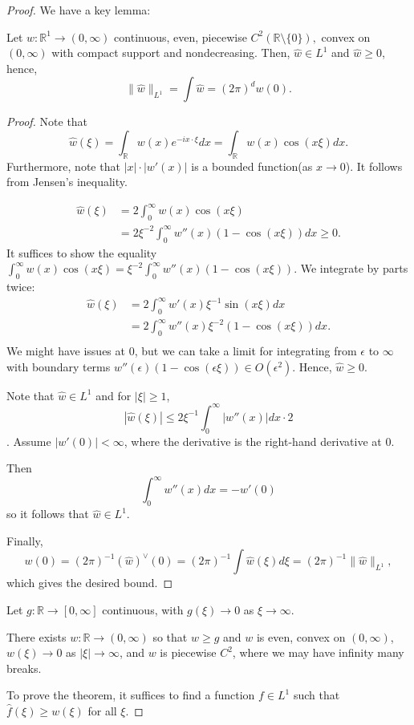 \documentclass[11pt]{scrartcl}
\newcommand{\R}{\mathbb{R}}
\let \hat \widehat
\newcommand{\<}{\langle}
\renewcommand{\>}{\rangle}
\begin{document}
\begin{proof}
We have a key lemma: 
\begin{lemma}
Let $w : \R^1 \rightarrow (0, \infty)$ continuous, even, piecewise $C^2(\R\setminus\{0\}),$ convex on $(0, \infty)$ with compact support and nondecreasing.  Then, $\hat{w} \in L^1$ and $\hat{w} \ge 0$, hence, $$\|\hat{w}\|_{L^1} = \int \hat{w} = (2\pi)^d w(0).$$
\end{lemma}
\begin{proof}
Note that 
$$\hat{w}(\xi) = \int_\R w(x) e^{-ix \cdot \xi} dx = \int_{\R} w(x) \cos(x \xi) dx.$$
Furthermore, note that $|x| \cdot |w'(x)|$ is a bounded function(as $x \rightarrow 0$).  It follows from Jensen's inequality.

\begin{align*}
\hat{w}(\xi) &= 2 \int_{0}^\infty w(x) \cos(x\xi) \\
&= 2 \xi^{-2} \int_0^{\infty} w''(x)(1 - \cos(x \xi)) dx
\ge 0.
\end{align*}
It suffices to show the equality $\int_{0}^\infty w(x) \cos(x\xi) = \xi^{-2} \int_0^{\infty} w''(x)(1 - \cos(x \xi))$.  We integrate by parts twice:
\begin{align*}
\hat{w}(\xi) &= 2 \int_{0}^\infty w'(x) \xi^{-1}\sin(x \xi)dx \\
&= 2 \int_0^\infty w''(x) \xi^{-2}(1 - \cos(x \xi))dx .\\
\end{align*}
We might have issues at $0$, but we can take a limit for integrating from $\epsilon$ to $\infty$ with boundary terms $w''(\epsilon)(1 - \cos(\epsilon \xi)) \in O(\epsilon^2)$.  Hence, $\hat{w} \ge 0$.

Note that $\hat{w} \in L^1$ and for $|\xi| \ge 1$, $$|\hat{w}(\xi)| \le 2 \xi^{-1} \int_0^\infty |w''(x)|dx \cdot 2$$.  
Assume $|w'(0)| < \infty$, where the derivative is the right-hand derivative at $0$.  

Then $$\int_0^{\infty} w''(x)dx = -w'(0)$$
so it follows that $\hat{w} \in L^1$.

Finally,
$$w(0) = (2\pi)^{-1} (\hat{w})^{\vee}(0) = (2\pi)^{-1} \int \hat{w}(\xi) d\xi = (2\pi)^{-1} \|\hat{w}\|_{L^1},$$
which gives the desired bound.
\end{proof}

Let $g: \R \rightarrow [0, \infty]$ continuous, with $g(\xi) \rightarrow 0$ as $\xi \rightarrow \infty$.  
\begin{lemma} There exists $w: \R \rightarrow (0, \infty)$ so that $w \ge g$ and $w$ is even, convex on $(0, \infty)$,  $w(\xi) \rightarrow 0$ as $|\xi| \rightarrow \infty$, and $w$ is piecewise $C^2$, where we may have infinity many breaks.  
\end{lemma}
To prove the theorem, it suffices to find a function $f \in L^1$ such that $\hat{f}(\xi) \ge w(\xi)$ for all $\xi$.


\end{proof}
\end{document}

